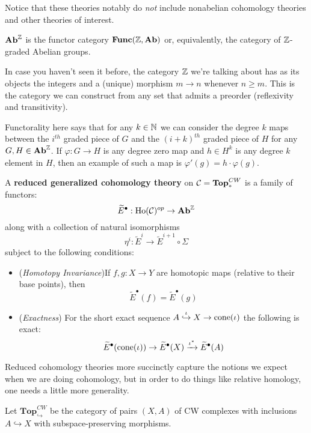 \documentclass[12pt]{article}
\newcommand*{\Func}{\mathbf{Func}}
\newcommand*{\pCW}{\mathbf{Top}^{CW}_\ast}
\newcommand*{\relCW}{\mathbf{Top}^{CW}_{\hookrightarrow}}
\begin{document}
Notice that these theories notably do \textit{not} include nonabelian cohomology theories and other theories of interest.
\begin{defn}
	$\mathbf{Ab}^{\mathbb{Z}}$ is the functor category $\Func(\bbZ,\Ab)$ or, equivalently, the category of $\mathbb{Z}$-graded Abelian groups.
\end{defn}
\begin{rmk}
	In case you haven't seen it before, the category $\mathbb{Z}$ we're talking about has as its objects the integers and 
	a (unique) morphism $m\to n$ whenever $n\ge m$. This is the category we can construct from any set that admits a preorder (reflexivity and transitivity).

	Functorality here says that for any $k\in\mathbb{N}$ we can consider the degree $k$ maps between the $i^{th}$ graded piece 
	of $G$ and the $(i+k)^{th}$ graded piece of $H$ for any $G,H\in\mathbf{Ab}^{\mathbb{Z}}$. If $\varphi:G\to H$ is any degree zero map and $h\in H^k$ is 
	any degree $k$ element in $H$, then an example of such a map is $\varphi'(g)=h\cdot \varphi(g).$
\end{rmk}
\begin{defn}\label{def-red-cohom}
	A \textbf{reduced generalized cohomology theory} on $\calC=\pCW$ is 
	a family of functors:
	\[\widetilde{E}^\bullet:\text{Ho}(\mathcal{C})^{op}\to\mathbf{Ab}^{\mathbb{Z}}\]
	along with a collection of natural isomorphisms
	\[\eta^i:\tilde E^i\to \tilde E^{i+1}\circ\Sigma\]
	subject to the following conditions:
	\begin{itemize}
		\item (\textit{Homotopy Invariance})If $f,g:X\to Y$ are homotopic maps (relative to their base points), then \[\tilde E^\bullet(f)=\tilde E^\bullet(g)\]
		\item (\textit{Exactness}) For the short exact sequence $A\stackrel{\iota}{\hookrightarrow} X\to \operatorname{cone}(\iota)$ the following is exact:
		\[\widetilde{E}^\bullet(\operatorname{cone}(\iota))\to \widetilde{E}^\bullet(X)\xrightarrow{\iota^\ast}\widetilde{E}^\bullet(A)\]
	\end{itemize}
\end{defn}

Reduced cohomology theories more succinctly capture the notions we expect when we are doing cohomology,
but in order to do things like relative homology, one needs a little more generality.

Let $\relCW$ be the category of pairs $(X,A)$ of CW complexes with inclusions $A\hookrightarrow X$ with subspace-preserving 
morphisms.
\end{document}
